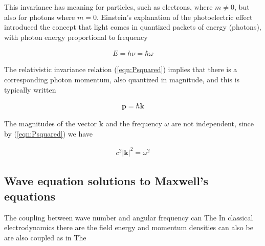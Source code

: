 \documentclass[]{eliblog}
\newcommand{\Abs}[1]{{\left\lvert{#1}\right\rvert}}
\newcommand{\BB}[0]{\mathbf{B}}
\newcommand{\BE}[0]{\mathbf{E}}
\newcommand{\Bk}[0]{\mathbf{k}}
\newcommand{\Bp}[0]{\mathbf{p}}
\newcommand{\cross}[0]{\times}
\begin{document}
This invariance has meaning for particles, such as electrons, where $m \ne 0$, but also for photons where $m = 0$.
Einstein's explanation of the photoelectric effect introduced the concept that light comes in
quantized packets of energy (photons), with photon energy proportional to frequency

\begin{align}
E = h \nu = \hbar \omega
\end{align}

The relativistic invariance relation (\ref{eqn:Psquared}) implies that there is a corresponding photon momentum, also
quantized in magnitude, and this is typically written

\begin{align}
\Bp = \hbar \Bk
\end{align}

The magnitudes of the vector $\Bk$ and the frequency $\omega$ are not independent, since by (\ref{eqn:Psquared}) we have

\begin{align}\label{eqn:omegaKsquared}
c^2 \Abs{\Bk}^2 = \omega^2
\end{align}

%
%
%
\subsection{Wave equation solutions to Maxwell's equations}

The coupling between wave number and angular frequency can 
The 
In classical electrodynamics there are the field energy and momentum densities can also be are also coupled as in 
The 
\end{document}

